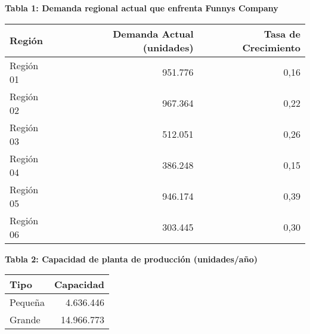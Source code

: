 \documentclass[a4paper]{article}
\begin{document}
    \newpage
        \textbf{Tabla 1: Demanda regional actual que enfrenta Funnys Company}
        \begin{center}
            \begin{tabular}{|l|r|r|}
                \hline
                Región & Demanda Actual (unidades) & Tasa de Crecimiento \\
                \hline
                Región 01 & 951.776 & 0,16 \\
                Región 02 & 967.364 & 0,22 \\
                Región 03 & 512.051 & 0,26 \\
                Región 04 & 386.248 & 0,15 \\
                Región 05 & 946.174 & 0,39 \\
                Región 06 & 303.445 & 0,30 \\
                \hline
            \end{tabular}
        \end{center}
        
        \vspace{0.5cm}
        
        \textbf{Tabla 2: Capacidad de planta de producción (unidades/año)}
        \begin{center}
            \begin{tabular}{|l|r|}
                \hline
                Tipo & Capacidad \\
                \hline
                Pequeña & 4.636.446 \\
                Grande & 14.966.773 \\
                \hline
            \end{tabular}
        \end{center}
        
        \vspace{0.5cm}
        
\end{document}
